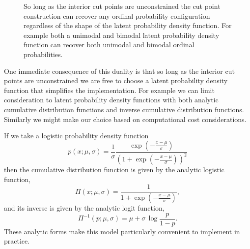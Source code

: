 \documentclass[
  letterpaper,
  DIV=11,
  numbers=noendperiod]{scrartcl}
\begin{document}
\begin{figure}


\caption{\label{fig-cut-point-flex}So long as the interior cut points
are unconstrained the cut point construction can recover any ordinal
probability configuration regardless of the shape of the latent
probability density function. For example both a unimodal and bimodal
latent probability density function can recover both unimodal and
bimodal ordinal probabilities.}

\end{figure}%

One immediate consequence of this duality is that so long as the
interior cut points are unconstrained we are free to choose a latent
probability density function that simplifies the implementation. For
example we can limit consideration to latent probability density
functions with both analytic cumulative distribution functions and
inverse cumulative distribution functions. Similarly we might make our
choice based on computational cost considerations.

If we take a logistic probability density function \[
p(x; \mu, \sigma)
=
\frac{1}{\sigma}
\frac{ \exp \left( - \frac{ x - \mu }{ \sigma } \right) }
{ \left( 1 + \exp \left( - \frac{ x - \mu }{ \sigma } \right) \right)^{2} }
\] then the cumulative distribution function is given by the analytic
logistic function, \[
\Pi(x; \mu, \sigma)
=
\frac{ 1 }{ 1 + \exp \left( - \frac{ x - \mu }{ \sigma } \right) },
\] and its inverse is given by the analytic logit function, \[
\Pi^{-1}(p; \mu, \sigma)
=
\mu + \sigma \, \log \frac{p}{1 - p}.
\] These analytic forms make this model particularly convenient to
implement in practice.
\end{document}
